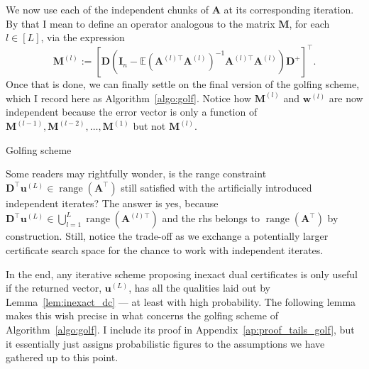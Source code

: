 We now use each of the independent chunks of $\mathbf{A}$ at its corresponding iteration. By that I mean to  define an operator analogous to the matrix $\mathbf{M}$, for each $l \in [L]$, via the expression
\begin{equation}\label{eq:def_M^l}
    \mathbf{M}^{(l)} := \left[ \mathbf{D} \left( \mathbf{I}_n - \mathbb{E} \left ( \mathbf{A}^{(l)\top}\mathbf{A}^{(l)} \right )^{-1} \mathbf{A}^{(l)\top} \mathbf{A}^{(l)} \right) \mathbf{D}^+ \right]^{\top}.
\end{equation}
Once that is done, we can finally settle on the final version of the golfing scheme, which I record here as Algorithm~\ref{algo:golf}. Notice how $\mathbf{M}^{(l)}$ and $ \mathbf{w}^{(l)}$ are now independent because the error vector is only a function of $\mathbf{M}^{(l-1)}, \mathbf{M}^{(l-2)}, \dots, \mathbf{M}^{(1)}$ but not $\mathbf{M}^{(l)}$.

\begin{algorithm}[H]
    \caption{Golfing scheme}\label{algo:golf}
    \begin{algorithmic}[1]
        \EndFor
    \end{algorithmic}
\end{algorithm}

Some readers may rightfully wonder, is the range constraint $\mathbf{D}^{\top}\mathbf{u}^{(L)} \in \operatorname{range} \left ( \mathbf{A^{\top}} \right )$ still satisfied with the artificially introduced independent iterates? The answer is yes, because $\mathbf{D}^{\top}\mathbf{u}^{(L)} \in \bigcup_{l=1}^{L} \operatorname{range} \left( \mathbf{A}^{(l)\top} \right)$ and the \acrlong{rhs} belongs to $\operatorname{range} \left( \mathbf{A}^\top \right)$ by construction. Still, notice the trade-off as we exchange a potentially larger certificate search space for the chance to work with independent iterates.

In the end, any iterative scheme proposing inexact dual certificates is only useful if the returned vector, $\mathbf{u}^{(L)}$, has all the qualities laid out by Lemma~\ref{lem:inexact_dc} --- at least with high probability. The following lemma makes this wish precise in what concerns the golfing scheme of Algorithm~\ref{algo:golf}. I include its proof in Appendix~\ref{ap:proof_tails_golf}, but it essentially just assigns probabilistic figures to the assumptions we have gathered up to this point.

